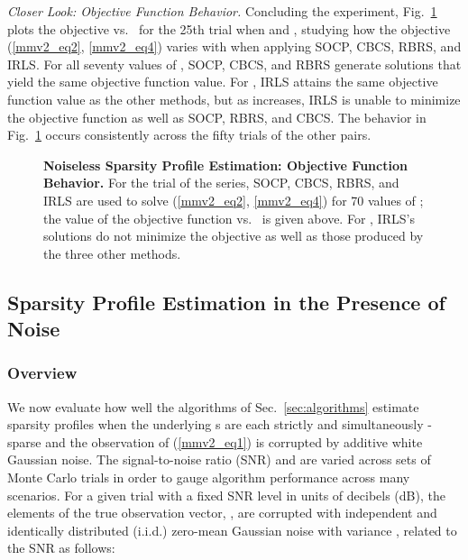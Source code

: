\documentclass[final]{siamltex}
\begin{document}
   {\em{Closer Look: Objective Function Behavior}.}  Concluding the
   experiment, Fig.~\ref{fig:e1_objfun} plots the objective
   vs.~ for the 25th trial when  and ,
   studying how the objective (\ref{mmv2_eq2}, \ref{mmv2_eq4}) varies
   with  when applying SOCP, CBCS, RBRS, and IRLS\@.  For all
   seventy values of , SOCP, CBCS, and RBRS
   generate solutions that yield the same objective function value.
   For , IRLS attains the same objective
   function value as the other methods, but as  increases,
   IRLS is unable to minimize the objective function as well as SOCP,
   RBRS, and CBCS\@.  The behavior in Fig.~\ref{fig:e1_objfun} occurs
   consistently across the fifty trials of the other  pairs.

\begin{figure}\centering

      \caption{{\bf{Noiseless Sparsity Profile Estimation: Objective
      Function Behavior}.} For the  trial of the
       series, SOCP, CBCS, RBRS, and IRLS are used to
      solve (\ref{mmv2_eq2}, \ref{mmv2_eq4}) for 70 values of ; the value of the objective function vs.~
      is given above.  For , IRLS's solutions
      do not minimize the objective as well as those produced by the
      three other methods.}

      \label{fig:e1_objfun}
   \end{figure}


\subsection{Sparsity Profile Estimation in the Presence of Noise}
\label{subsec:e2}

   \subsubsection{Overview} We now evaluate how well the algorithms of
   Sec.~\ref{sec:algorithms} estimate sparsity profiles when the
   underlying s are each strictly and simultaneously
   -sparse and the observation  of (\ref{mmv2_eq1}) is
   corrupted by additive white Gaussian noise.  The
   signal-to-noise ratio (SNR) and  are varied across sets of Monte
   Carlo trials in order to gauge algorithm performance across many
   scenarios.  For a given trial with a fixed SNR level in units of
   decibels (dB), the  elements of the true observation vector,
   , are corrupted with independent and
   identically distributed (i.i.d.)  zero-mean Gaussian noise with
   variance , related to the SNR as follows:
   
\end{document}
